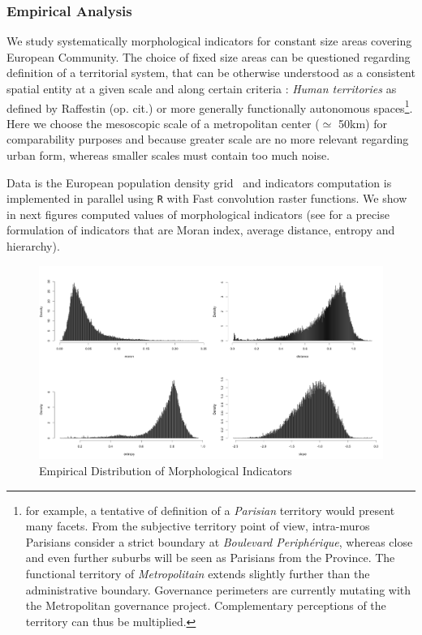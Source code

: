 \subsubsection{Empirical Analysis}

We study systematically morphological indicators for constant size areas covering European Community. The choice of fixed size areas can be questioned regarding definition of a territorial system, that can be otherwise understood as a consistent spatial entity at a given scale and along certain criteria : \emph{Human territories} as defined by Raffestin (op. cit.) or more generally functionally autonomous spaces\footnote{for example, a tentative of definition of a \textit{Parisian} territory would present many facets. From the subjective territory point of view, intra-muros Parisians consider a strict boundary at \textit{Boulevard Periph{\'e}rique}, whereas close and even further suburbs will be seen as Parisians from the Province. The functional territory of \textit{Metropolitain} extends slightly further than the administrative boundary. Governance perimeters are currently mutating with the Metropolitan governance project. Complementary perceptions of the territory can thus be multiplied.}. Here we choose the mesoscopic scale of a metropolitan center ($\simeq$ 50km) for comparability purposes and because greater scale are no more relevant regarding urban form, whereas smaller scales must contain too much noise. 

Data is the European population density grid~\cite{eurostat} and indicators computation is implemented in parallel using \texttt{R} with Fast convolution raster functions. We show in next figures computed values of morphological indicators (see \cite{le2015forme} for a precise formulation of indicators that are Moran index, average distance, entropy and hierarchy).



\begin{figure}
\includegraphics[width=1.2\textwidth]{Figures/PartII/Empirical/Static/Density/hists_GOOD}
\caption[Empirical Distribution of Morphological Indicators]{Empirical Distribution of Morphological Indicators}
\end{figure}

